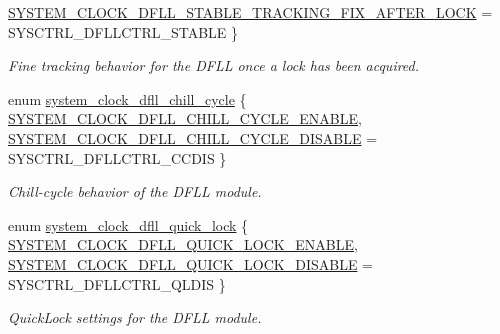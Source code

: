 \begin{DoxyCompactItemize}
\mbox{\hyperlink{group__asfdoc__sam0__system__clock__group_ggaf9b0eb010541f1d7c8af3eeb0573043da40176c0aa1d57b6ec9f7de182b937c5a}{S\+Y\+S\+T\+E\+M\+\_\+\+C\+L\+O\+C\+K\+\_\+\+D\+F\+L\+L\+\_\+\+S\+T\+A\+B\+L\+E\+\_\+\+T\+R\+A\+C\+K\+I\+N\+G\+\_\+\+F\+I\+X\+\_\+\+A\+F\+T\+E\+R\+\_\+\+L\+O\+CK}} = S\+Y\+S\+C\+T\+R\+L\+\_\+\+D\+F\+L\+L\+C\+T\+R\+L\+\_\+\+S\+T\+A\+B\+LE
 \}
\begin{DoxyCompactList}\small\item\em Fine tracking behavior for the D\+F\+LL once a lock has been acquired. \end{DoxyCompactList}\item 
enum \mbox{\hyperlink{group__asfdoc__sam0__system__clock__group_ga04ee95a872995397e3db9cf1494721e3}{system\+\_\+clock\+\_\+dfll\+\_\+chill\+\_\+cycle}} \{ \mbox{\hyperlink{group__asfdoc__sam0__system__clock__group_gga04ee95a872995397e3db9cf1494721e3ad75095e64d38dbba6451c496645b7e01}{S\+Y\+S\+T\+E\+M\+\_\+\+C\+L\+O\+C\+K\+\_\+\+D\+F\+L\+L\+\_\+\+C\+H\+I\+L\+L\+\_\+\+C\+Y\+C\+L\+E\+\_\+\+E\+N\+A\+B\+LE}}, 
\mbox{\hyperlink{group__asfdoc__sam0__system__clock__group_gga04ee95a872995397e3db9cf1494721e3a1f84a60dcc044d7bc33cf71cddb985a3}{S\+Y\+S\+T\+E\+M\+\_\+\+C\+L\+O\+C\+K\+\_\+\+D\+F\+L\+L\+\_\+\+C\+H\+I\+L\+L\+\_\+\+C\+Y\+C\+L\+E\+\_\+\+D\+I\+S\+A\+B\+LE}} = S\+Y\+S\+C\+T\+R\+L\+\_\+\+D\+F\+L\+L\+C\+T\+R\+L\+\_\+\+C\+C\+D\+IS
 \}
\begin{DoxyCompactList}\small\item\em Chill-\/cycle behavior of the D\+F\+LL module. \end{DoxyCompactList}\item 
enum \mbox{\hyperlink{group__asfdoc__sam0__system__clock__group_ga56ab87696abcd4e0103d6259386017ae}{system\+\_\+clock\+\_\+dfll\+\_\+quick\+\_\+lock}} \{ \mbox{\hyperlink{group__asfdoc__sam0__system__clock__group_gga56ab87696abcd4e0103d6259386017aea0599c04b640c394c9fba065ae8e8b616}{S\+Y\+S\+T\+E\+M\+\_\+\+C\+L\+O\+C\+K\+\_\+\+D\+F\+L\+L\+\_\+\+Q\+U\+I\+C\+K\+\_\+\+L\+O\+C\+K\+\_\+\+E\+N\+A\+B\+LE}}, 
\mbox{\hyperlink{group__asfdoc__sam0__system__clock__group_gga56ab87696abcd4e0103d6259386017aea1d2b1b500737f7722a86e3242cf2250c}{S\+Y\+S\+T\+E\+M\+\_\+\+C\+L\+O\+C\+K\+\_\+\+D\+F\+L\+L\+\_\+\+Q\+U\+I\+C\+K\+\_\+\+L\+O\+C\+K\+\_\+\+D\+I\+S\+A\+B\+LE}} = S\+Y\+S\+C\+T\+R\+L\+\_\+\+D\+F\+L\+L\+C\+T\+R\+L\+\_\+\+Q\+L\+D\+IS
 \}
\begin{DoxyCompactList}\small\item\em Quick\+Lock settings for the D\+F\+LL module. \end{DoxyCompactList}\item 

\end{DoxyCompactItemize}
